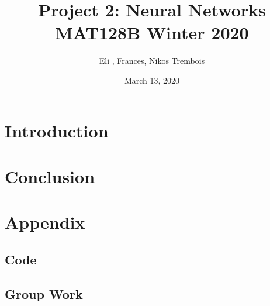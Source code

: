 \documentclass[letterpaper,11pt]{article}
\begin{document}
\title{Project 2: Neural Networks \\
		\large MAT128B Winter 2020}
\author{Eli , Frances, Nikos Trembois}
\date{March 13, 2020}
\maketitle
\tableofcontents
\newpage

\section*{Introduction}


\section{Conclusion}

\newpage

\section{Appendix}

\subsection{Code}
%

\subsection{Group Work}
\end{document}
